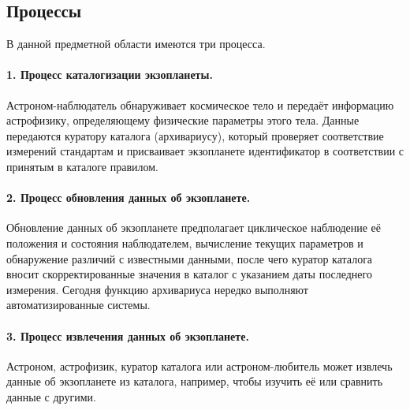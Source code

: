 \documentclass[14pt,a4paper]{extarticle}
\begin{document}
	\subsection{Процессы}
	
	В данной предметной области имеются три процесса.
	
	\paragraph{1. Процесс каталогизации экзопланеты.} Астроном-наблюдатель обнаруживает космическое тело и передаёт информацию астрофизику, определяющему физические параметры этого тела. Данные передаются куратору каталога (архивариусу), который проверяет соответствие измерений стандартам и присваивает экзопланете идентификатор в соответствии с принятым в каталоге правилом.
	
	
	\paragraph{2. Процесс обновления данных об экзопланете.} Обновление данных об экзопланете предполагает циклическое наблюдение её положения и состояния наблюдателем, вычисление текущих параметров и обнаружение различий с известными данными, после чего куратор каталога вносит скорректированные значения в каталог с указанием даты последнего измерения. Сегодня функцию архивариуса нередко выполняют автоматизированные системы.
	
	
	\paragraph{3. Процесс извлечения данных об экзопланете.} Астроном, астрофизик, куратор каталога или астроном-любитель может извлечь данные об экзопланете из каталога, например, чтобы изучить её или сравнить данные с другими.
	
\end{document}
